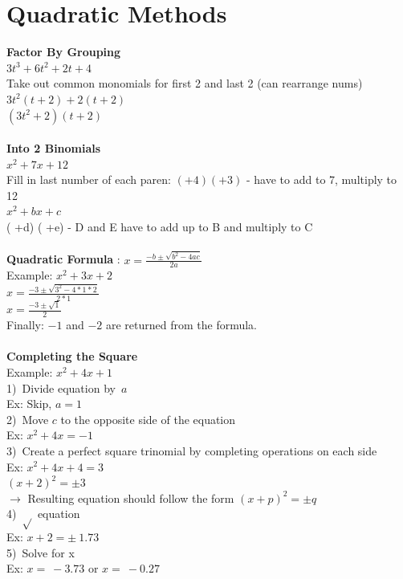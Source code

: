 \documentclass{article}
\begin{document}
	\section*{Quadratic Methods}
	\textbf{Factor By Grouping} \\
	$3t^3 + 6t^2 + 2t + 4$  \\
	Take out common monomials for first 2 and last 2 (can rearrange nums) \\
	$3t^2(t + 2) + 2(t+2)$ \\
	$(3t^2 + 2) (t+2)$ \\ \\
	\textbf{Into 2 Binomials} \\
	$x^2 + 7x + 12$ \\
	Fill in last number of each paren: $( + 4) ( + 3)$ - have to add to 7, multiply to 12 \\
	$x^2 + bx + c$ \\
	(  +d) (  +e) - D and E have to add up to B and multiply to C \\\\
	\textbf{Quadratic Formula} : $x=\frac{-b\pm\sqrt{b^2-4ac}}{2a}$ \\
	Example: $x^2+3x+2$ \\
	$x=\frac{-3\pm\sqrt{3^2-4*1*2}}{2*1}$ \\
	$x=\frac{-3\pm\sqrt{1}}{2}$ \\
	Finally: $-1$ and $-2$ are returned from the formula. \\ \\
	\textbf{Completing the Square} \\
	Example: $x^2+4x+1$ \\
	1) Divide equation by $a$ \\
	Ex: Skip, $a=1$\\
	2) Move $c$ to the opposite side of the equation \\
		Ex: $x^2+4x = -1$ \\
	3) Create a perfect square trinomial by completing operations on each side \\
		Ex: $x^2 + 4x + 4 = 3$\\
	$(x+2)^2 = \pm 3$\\
	$\rightarrow$ Resulting equation should follow the form $(x + p)^2 = \pm q$\\
	4) $\sqrt{}$ equation \\
		Ex: $x+2 = \pm ~1.73$ \\
	5) Solve for x\\
		Ex: $x = ~-3.73$ or $x = ~-0.27$
	
\end{document}
